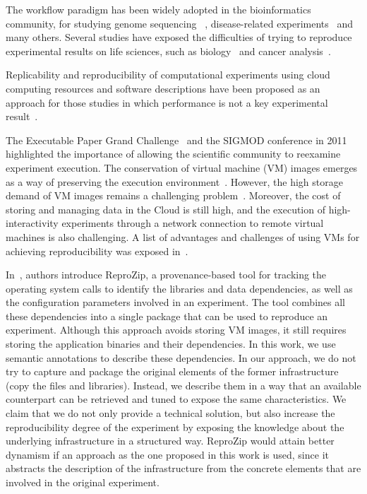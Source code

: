 The workflow paradigm has been widely adopted in the bioinformatics community, for studying genome sequencing ~\cite{blankenberg2010galaxy, giardine2005galaxy}, disease-related experiments~\cite{fisher2009systematic, gaizauskas2004} and many others. Several studies have exposed the difficulties of trying to reproduce experimental results on life sciences, such as biology~\cite{Ioannidis2009} and cancer analysis~\cite{ErringtonCancerRerpoducibility}.

Replicability and reproducibility of computational experiments using cloud computing resources and software descriptions have been proposed as an approach for those studies in which performance is not a key experimental result~\cite{Crick14}.

The Executable Paper Grand Challenge~\cite{elsevierchallenge} and the SIGMOD conference in 2011~\cite{SIGMOD} highlighted the importance of allowing the scientific community to reexamine experiment execution. The conservation of virtual machine (VM) images emerges as a way of preserving the execution environment~\cite{Brammer,SHARE}. However, the high storage demand of VM images remains a challenging problem~\cite{Mao:2014:ROD:2600090.2512348,6552826}. Moreover, the cost of storing and managing data in the Cloud is still high, and the execution of high-interactivity experiments through a network connection to remote virtual machines is also challenging. A list of advantages and challenges of using VMs for achieving reproducibility was exposed in~\cite{Howe2012}.

In~\cite{reprozip}, authors introduce ReproZip, a provenance-based 
tool for tracking the operating system calls to identify the libraries and 
data dependencies, as well as the configuration parameters involved 
in an experiment. The tool combines all these dependencies into a 
single package that can be used to reproduce an experiment. 
Although this approach avoids storing VM images, it still requires 
storing the application binaries and their dependencies. In this work, we
use semantic annotations to describe these dependencies. In our 
approach, we do not try to capture and package the original elements of 
the former infrastructure (copy the files and libraries). Instead, we describe 
them in a way that an available counterpart can be retrieved and tuned to 
expose the same characteristics. We claim that we do not only provide a 
technical solution, but also increase the reproducibility degree of the 
experiment by exposing the knowledge about the underlying infrastructure 
in a structured way. ReproZip would attain better dynamism if an 
approach as the one proposed in this work is used, since it abstracts 
the description of the infrastructure from the concrete elements that 
are involved in the original experiment.


